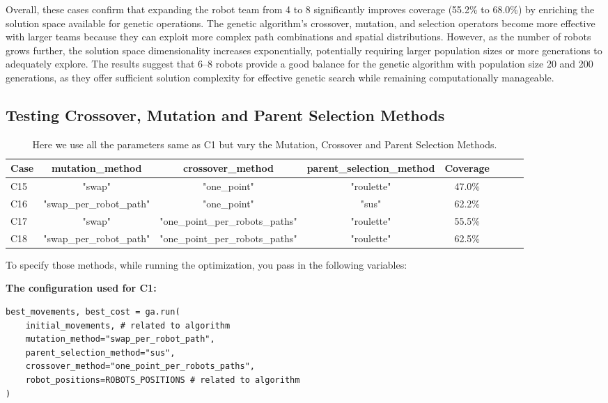 Overall, these cases confirm that expanding the robot team from 4 to 8 significantly improves coverage (55.2\% to 68.0\%) by enriching the solution space available for genetic operations. 
The genetic algorithm's crossover, mutation, and selection operators become more effective with larger teams because they can exploit more complex path combinations and spatial distributions.
However, as the number of robots grows further, the solution space dimensionality increases exponentially, potentially requiring larger population sizes or more generations to adequately explore.
The results suggest that 6–8 robots provide a good balance for the genetic algorithm with population size 20 and 200 generations, as they offer sufficient solution complexity for effective genetic search while remaining computationally manageable.

\subsection{Testing Crossover, Mutation and Parent Selection Methods}

\begin{table}[H]
\centering
\caption{Here we use all the parameters same as C1 but vary the Mutation, Crossover and Parent Selection Methods. }
\begin{tabular}{@{}lccccccc@{}}
\toprule
\textbf{Case} & \textbf{mutation\_method} & \textbf{crossover\_method} & \textbf{parent\_selection\_method} & \textbf{Coverage} \\
\midrule
C15 & "swap" & "one\_point" & "roulette" & 47.0\% \\
C16 & "swap\_per\_robot\_path" & "one\_point" & "sus" & 62.2\% \\
C17 & "swap" & "one\_point\_per\_robots\_paths" & "roulette" & 55.5\%\\
C18 & "swap\_per\_robot\_path" & "one\_point\_per\_robots\_paths" & "roulette" & 62.5\%\\
\bottomrule
\end{tabular}
\label{tab:ga_methods}
\end{table}

To specify those methods, while running the optimization, you pass in the following variables:

\textbf{The configuration used for C1:}

\begin{verbatim}
best_movements, best_cost = ga.run(
    initial_movements, # related to algorithm
    mutation_method="swap_per_robot_path",
    parent_selection_method="sus",
    crossover_method="one_point_per_robots_paths",
    robot_positions=ROBOTS_POSITIONS # related to algorithm
)
\end{verbatim}

